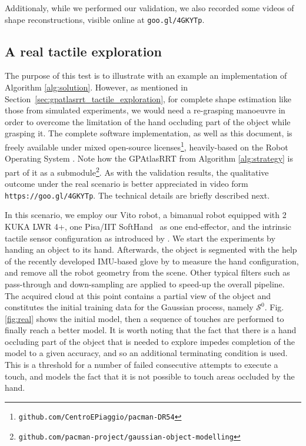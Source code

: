 Additionaly, while we performed our validation, we also recorded some videos of shape reconstructions, visible online at \texttt{goo.gl/4GKYTp}.

\vspace{-2em}
\subsection{A real tactile exploration}
\label{sec:real}

The purpose of this test is to illustrate with an example an implementation of Algorithm \ref{alg:solution}. However, as mentioned in Section~\ref{sec:gpatlasrrt_tactile_exploration}, for complete shape estimation like those from simulated experiments, we would need a re-grasping manoeuvre in order to overcome the limitation of the hand occluding part of the object while grasping it. The complete software implementation, as well as this document, is freely available under mixed open-source licenses\footnote{\texttt{github.com/CentroEPiaggio/pacman-DR54}}, heavily-based on the Robot Operating System \citet{ROS}. Note how the GPAtlasRRT from Algorithm \ref{alg:strategy} is part of it as a submodule\footnote{\texttt{github.com/pacman-project/gaussian-object-modelling}}. As with the validation results, the qualitative outcome under the real scenario is better appreciated in video form \texttt{https://goo.gl/4GKYTp}. The technical details are briefly described next.

In this scenario, we employ our Vito robot, a bimanual robot equipped with 2 KUKA LWR 4+, one Pisa/IIT SoftHand~\citep{Catalano2014Adaptive} as one end-effector, and the intrinsic tactile sensor configuration as introduced by \citet{Rosales2014Active}. We start the experiments by handing an object to its hand. Afterwards, the object is segmented with the help of the recently developed IMU-based glove by \citet{Santaera2015Lowcost} to measure the hand configuration, and remove all the robot geometry from the scene. Other typical filters such as pass-through and down-sampling are applied to speed-up the overall pipeline. The acquired cloud at this point contains a partial view of the object and constitutes the initial training data for the Gaussian process, namely $\mathcal{S}^0$. Fig. \ref{fig:real} shows the initial model, then a sequence of touches are performed to finally reach a better model. It is worth noting that the fact that there is a hand occluding part of the object that is needed to explore impedes completion of the model to a given accuracy, and so an additional terminating condition is used. This is a threshold for a number of failed consecutive attempts to execute a touch, and models the fact that it is not possible to touch areas occluded by the hand.

